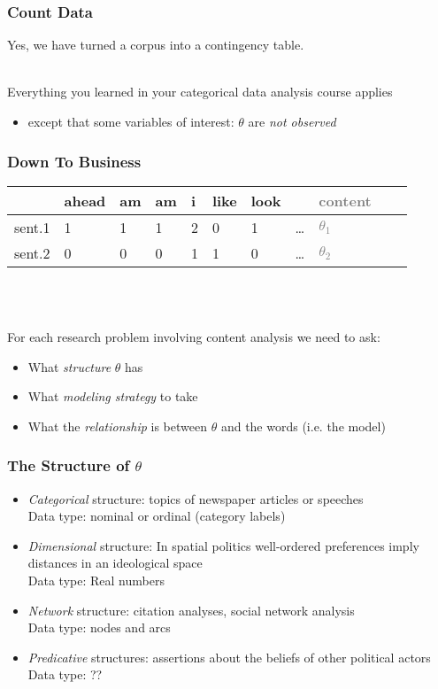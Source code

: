 \documentclass[11pt,compress,professionalfonts]{beamer}
\newcommand{\ita}{\begin{itemize}}
\newcommand{\itm}{\item[]}
\newcommand{\itz}{\end{itemize}}
\begin{document}
\begin{frame}[t,fragile]\frametitle{Count Data}

Yes, we have turned a corpus into a contingency table.

~\\
Everything you learned in your categorical data analysis course applies
\ita
\itm except that some variables of interest: $\theta$ are \textit{not observed}
\itz


\end{frame}
\begin{frame}[t,fragile]\frametitle{Down To Business}

\begin{center}
\small
\begin{tabular}{rllllllllll}\toprule
& ahead & am & am & i & like & look &  & \textcolor{gray}{content} \\ \midrule
sent.1  & 1     & 1  & 1  & 2 & 0    & 1    & \ldots & \textcolor{gray}{$\theta_1$} \\
sent.2  & 0     & 0  & 0  & 1 & 1    & 0    & \ldots & \textcolor{gray}{$\theta_2$} \\ \bottomrule
\end{tabular}
\normalsize
\end{center}
~\\\

For each research problem involving content analysis we need to ask:
\ita
\itm What \textit{structure} $\theta$ has
\itm What \textit{modeling strategy} to take
\itm What the \textit{relationship} is between $\theta$ and the words (i.e. the model)
\itz

\end{frame}
\begin{frame}[t,fragile]\frametitle{The Structure of $\theta$}

\ita
\itm \textsl{Categorical} structure: topics of newspaper articles or speeches\\Data type: nominal or ordinal (category labels)
\itm \textsl{Dimensional} structure: In spatial politics well-ordered preferences imply distances in an ideological space\\Data type: Real numbers
\itm \textsl{Network} structure: citation analyses, social network analysis\\Data type: nodes and arcs
\itm \textsl{Predicative} structures: assertions about the beliefs of other political actors\\Data type: ??
\itz

\end{frame}
\end{document}
